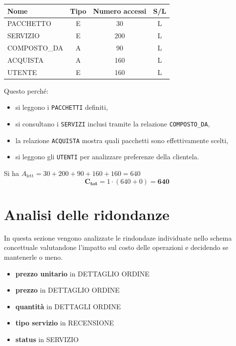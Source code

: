 \documentclass[a4paper,12pt]{report}
\begin{document}
\begin{enumerate}
	      \begin{table}[H]
		      \centering
		      \small
		      \renewcommand{\arraystretch}{1.15}
		      \begin{tabularx}{0.8\textwidth}{|X|c|c|c|}
			      \hline
			      \rowcolor{gray!20}
			      \textbf{Nome} & \textbf{Tipo} & \textbf{Numero accessi} & \textbf{S/L} \\
			      \hline
			      PACCHETTO     & E             & 30                      & L            \\
			      SERVIZIO      & E             & 200                     & L            \\
			      COMPOSTO\_DA  & A             & 90                      & L            \\
			      ACQUISTA      & A             & 160                     & L            \\
			      UTENTE        & E             & 160                     & L            \\
			      \hline
		      \end{tabularx}
	      \end{table}

	      Questo perché:
	      \begin{itemize}
		      \item si leggono i \texttt{PACCHETTI} definiti,
		      \item si consultano i \texttt{SERVIZI} inclusi tramite la relazione \texttt{COMPOSTO\_DA},
		      \item la relazione \texttt{ACQUISTA} mostra quali pacchetti sono effettivamente scelti,
		      \item si leggono gli \texttt{UTENTI} per analizzare preferenze della clientela.
	      \end{itemize}

	      Si ha $A_{\text{lett}} = 30 + 200 + 90 + 160 + 160 = 640$
	      $$\mathbf{C_{tot}} = 1 \cdot (640 + 0) = \mathbf{640}$$
\end{enumerate}

\section{Analisi delle ridondanze}
In questa sezione vengono analizzate le rindondaze individuate nello schema concettuale valutandone l'impatto sul
costo delle operazioni e decidendo se mantenerle o meno.

\begin{itemize}
	\item \textbf{prezzo unitario} in DETTAGLIO ORDINE
	\item \textbf{prezzo} in DETTAGLIO ORDINE
	\item \textbf{quantità} in DETTAGLI ORDINE
	\item \textbf{tipo servizio} in RECENSIONE
	\item \textbf{status} in SERVIZIO
\end{itemize}
\end{document}
